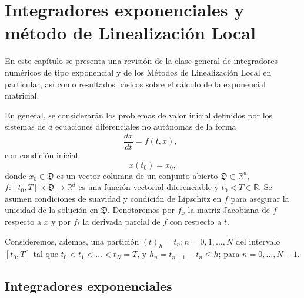 \chapter{Integradores exponenciales y método de Linealización Local}\label{chapter:exp-int-and-ll-methods}

En este capítulo se presenta una revisión de la clase general de  integradores numéricos de tipo exponencial y de los Métodos de Linealización Local en particular, así como resultados básicos sobre el cálculo de la exponencial matricial.

En general, se considerarán los problemas de valor inicial definidos por los sistemas de $d$ ecuaciones diferenciales no autónomas de la forma
 \begin{equation}
 \frac{dx}{dt}=f(t,x), \;\; \label{ODE-SYST}
 \end{equation}
con condición inicial
 \begin{equation*}
 x(t_0)=x_0,
 \end{equation*}
 donde $x_0\in \mathfrak{D}$ es un vector columna de un conjunto abierto $\mathfrak{D}\subset\mathbb{R}^{d}$, $f: [t_0,T] \times \mathfrak{D}\longrightarrow \mathbb{R}^{d}$ es una función vectorial diferenciable y $t_0<T \in \mathbb{R}$. Se asumen condiciones de suavidad y condición de Lipschitz en $f$ para asegurar la unicidad de la solución en $\mathfrak{D}$. Denotaremos por $f_x$ la matriz Jacobiana de $f$ respecto a $x$ y por $f_t$ la derivada parcial de $f$ con respecto a $t$.

Consideremos, ademas, una partición $(t)_{h}={t_{n}:n=0,1,\ldots,N}$ del
intervalo $[t_{0},T]$ tal que $t_{0}<t_{1}<\ldots<t_{N}=T$, y $%
h_{n}=t_{n+1}-t_{n}\leq h$; para $n=0,\ldots,N-1$.

\section{Integradores exponenciales} \label{Sec:IE}

